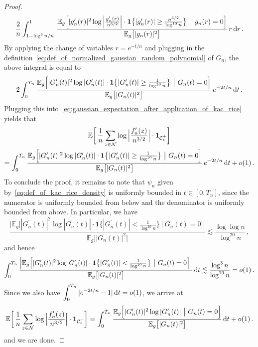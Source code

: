 \documentclass[11pt]{amsart}
\theoremstyle{remark}
\theoremstyle{definition}
\newcommand{\bE}{\mathbb E}
\newcommand{\cC}{\mathcal C}
\newcommand{\cN}{\mathcal N}
\newcommand{\one}{\boldsymbol{1}}
\begin{document}
\begin{proof}
        \[ 
        \frac{2}{n}\int_{1-\log^3n/n}^1 \, \frac{\bE_g\Big[ |g_n^\prime(r)|^2 \log\Big|\frac{g_n^\prime(r)}{n^{3/2}}\Big| \cdot \one\big\{|g_n^\prime(r)|\ge\frac{n^{3/2}}{\log^{10}n} \big\} \ \mid g_n(r)=0\Big]}{ \bE_g\big[|g_n(r)|^2\big]} \, r \,  {\rm d}r \, .
        \]
        By applying the change of variables $r=e^{-t/n}$ and plugging in the definition~\eqref{eq:def_of_normalized_gaussian_random_polynomial} of $G_n$, the above integral is equal to 
        \[
        2 \int_{0}^{T_n}\frac{\bE_g\Big[ |G_n^\prime(t)|^2 \log|G_n^\prime(t)| \cdot \one\big\{|G_n^\prime(t)|\ge \frac{1}{\log^{10}n}\big\} \  \big| \  G_n(t)=0\Big]}{ \bE_g\big[|G_n(t)|^2\big]} \, e^{-2t/n} \, {\rm d}t \, . 
        \]
        Plugging this into~\eqref{eq:gaussian_expectation_after_application_of_kac_rice} yields that
        \begin{multline*}
                \bE\bigg[ \,  \frac{1}{n} \sum_{z \in \cN} \log \Big|\frac{f_n'(z)}{n^{3/2}} \Big| \cdot \one_{\cC_z^+} \bigg]         
              \\ =  \int_{0}^{T_n}\frac{\bE_g\Big[ |G_n^\prime(t)|^2 \log|G_n^\prime(t)| \cdot \one\big\{|G_n^\prime(t)|\ge \frac{1}{\log^{10}n}\big\} \  \big| \  G_n(t)=0\Big]}{ \bE_g\big[|G_n(t)|^2\big]} \, e^{-2t/n} \, {\rm d}t + o(1) \, . 
        \end{multline*}
        To conclude the proof, it remains to note that $\psi_n$ given by~\eqref{eq:def_of_kac_rice_density} is uniformly bounded in $t\in[0,T_n]$, since the numerator is uniformly bounded from below and the denominator is uniformly bounded from above. In particular, we have 
        \[
        \frac{\Big|\bE_g\Big[ |G_n^\prime(t)|^2 \log|G_n^\prime(t)| \cdot \one\big\{|G_n^\prime(t)| < \frac{1}{\log^{10}n}\big\} \  \big| \  G_n(t)=0\Big]\Big|}{ \bE_g\big[|G_n(t)|^2\big]}  \lesssim \frac{\log \log n}{\log ^{20}n} \, ,
        \]
        and hence
        \[
        \int_{0}^{T_n}   \frac{\Big|\bE_g\Big[ |G_n^\prime(t)|^2 \log|G_n^\prime(t)| \cdot \one\big\{|G_n^\prime(t)| < \frac{1}{\log^{10}n}\big\} \  \big| \  G_n(t)=0\Big] \Big|}{ \bE_g\big[|G_n(t)|^2\big]}  \, {\rm d}t \lesssim \frac{\log^3 n}{\log^{19}n}  = o(1) \, .
        \]
        Since we also have $\displaystyle \int_0^{T_n} |e^{-2t/n}-1| \,  {\rm d}t = o(1)$, we arrive at
        \begin{equation*}
                \bE\bigg[ \,  \frac{1}{n} \sum_{z \in \cN} \log \Big|\frac{f_n'(z)}{n^{3/2}} \Big| \cdot \one_{\cC_z^+} \bigg]         
              \\ =  \int_{0}^{T_n}\frac{\bE_g\Big[ |G_n^\prime(t)|^2 \log|G_n^\prime(t)|\  \big| \  G_n(t)=0\Big]}{ \bE_g\big[|G_n(t)|^2\big]}  \, {\rm d}t + o(1) \, . 
        \end{equation*}
        and we are done.
    \end{proof}
\end{document}
